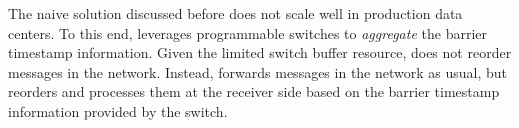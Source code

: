 




 The naive solution discussed before does not scale well in production data centers. To this end, \sys leverages programmable switches to \emph{aggregate} the barrier timestamp information. Given the limited switch buffer resource, \sys does not reorder messages in the network. Instead, \sys forwards messages in the network as usual, but reorders and processes them at the receiver side based on the barrier timestamp information provided by the switch.

